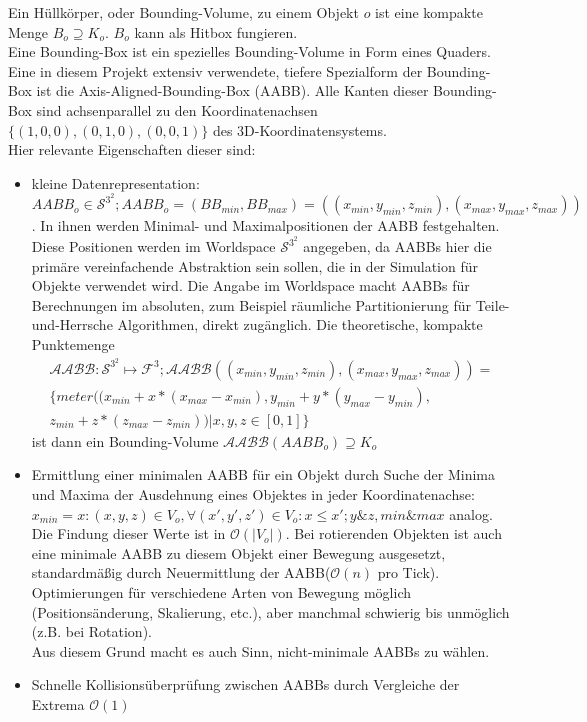 \label{sec:bounding_volume}
\label{sec:aabb}
\label{sec:AABB}
Ein Hüllkörper, oder Bounding-Volume, zu einem Objekt $o$ ist eine kompakte Menge $B_o \supseteq K_{o}$. $B_o$ kann als Hitbox fungieren.\\
Eine Bounding-Box ist ein spezielles Bounding-Volume in Form eines Quaders.\\
Eine in diesem Projekt extensiv verwendete, tiefere Spezialform der Bounding-Box ist die Axis-Aligned-Bounding-Box (AABB). Alle Kanten dieser Bounding-Box sind achsenparallel zu den Koordinatenachsen $\{(1,0,0), (0,1,0), (0,0,1)\}$ des 3D-Koordinatensystems.\\
Hier relevante Eigenschaften dieser sind:
\begin{itemize}
\item kleine Datenrepresentation:
		$$AABB_o \in \mathcal{S}^{3^2}; AABB_o = (BB_{min}, BB_{max}) = ((x_{min}, y_{min}, z_{min}), (x_{max}, y_{max}, z_{max}))$$.
		 In ihnen werden Minimal- und Maximalpositionen der AABB festgehalten.
		 Diese Positionen werden im Worldspace $\mathcal{S}^{3^2}$ angegeben, da AABBs hier die primäre vereinfachende Abstraktion sein sollen, die in der Simulation für Objekte verwendet wird. Die Angabe im Worldspace macht AABBs für Berechnungen im absoluten, zum Beispiel räumliche Partitionierung für Teile-und-Herrsche Algorithmen, direkt zugänglich.
		 Die theoretische, kompakte Punktemenge 
		 \begin{align*}
		 \mathcal{AABB}: \mathcal{S}^{3^2} \mapsto \mathcal{F}^3;
		 \mathcal{AABB} ((x_{min}, y_{min}, z_{min}), (x_{max}, y_{max}, z_{max})) = \\
		 \{meter((x_{min} + x * (x_{max} - x_{min}), y_{min} + y * (y_{max} - y_{min}),\\
		  z_{min} + z * (z_{max} - z_{min}))| x, y, z \in [0,1] \} 
		 \end{align*}
		 ist dann ein Bounding-Volume $\mathcal{AABB}(AABB_o) \supseteq K_o$
	\item Ermittlung einer minimalen AABB für ein Objekt durch Suche der Minima und Maxima der Ausdehnung eines Objektes in jeder Koordinatenachse:
	 $x_{min} = x : (x, y, z) \in V_o , \forall (x', y', z') \in V_o: x \leq x'; y \& z, min \& max $ analog.
	 Die Findung dieser Werte ist in $ \mathcal{O}(|V_o|) $.
		Bei rotierenden Objekten ist auch eine minimale AABB zu diesem Objekt einer Bewegung ausgesetzt, standardmäßig durch Neuermittlung der AABB($\mathcal{O}(n)$ pro Tick). Optimierungen für verschiedene Arten von Bewegung möglich (Positionsänderung, Skalierung, etc.), aber manchmal schwierig bis unmöglich (z.B. bei Rotation).\\
		Aus diesem Grund macht es auch Sinn, nicht-minimale AABBs zu wählen.
	\item Schnelle Kollisionsüberprüfung zwischen AABBs durch Vergleiche der Extrema $\mathcal{O}(1)$
\end{itemize}

